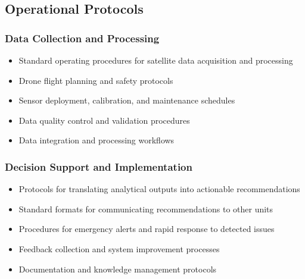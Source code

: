 \subsection{Operational Protocols}

\subsubsection{Data Collection and Processing}
\begin{itemize}
    \item Standard operating procedures for satellite data acquisition and processing
    \item Drone flight planning and safety protocols
    \item Sensor deployment, calibration, and maintenance schedules
    \item Data quality control and validation procedures
    \item Data integration and processing workflows
\end{itemize}

\subsubsection{Decision Support and Implementation}
\begin{itemize}
    \item Protocols for translating analytical outputs into actionable recommendations
    \item Standard formats for communicating recommendations to other units
    \item Procedures for emergency alerts and rapid response to detected issues
    \item Feedback collection and system improvement processes
    \item Documentation and knowledge management protocols
\end{itemize}

